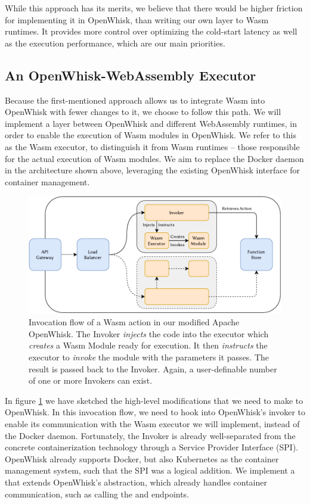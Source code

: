 While this approach has its merits, we believe that there would be higher friction for implementing it in OpenWhisk, than writing our own layer to Wasm runtimes. It provides more control over optimizing the cold-start latency as well as the execution performance, which are our main priorities.

\subsection{An OpenWhisk-WebAssembly Executor}

Because the first-mentioned approach allows us to integrate Wasm into OpenWhisk with fewer changes to it, we choose to follow this path. We will implement a layer between OpenWhisk and different WebAssembly runtimes, in order to enable the execution of Wasm modules in OpenWhisk. We refer to this as the Wasm executor, to distinguish it from Wasm runtimes -- those responsible for the actual execution of Wasm modules. We aim to replace the Docker daemon in the architecture shown above, leveraging the existing OpenWhisk interface for container management.

\begin{figure}
    \includegraphics{figures/WasmOpenWhiskActionInvocationFlow.pdf}
    \caption{Invocation flow of a Wasm action in our modified Apache OpenWhisk. The Invoker \emph{injects} the code into the executor which \emph{creates} a Wasm Module ready for execution. It then \emph{instructs} the executor to \emph{invoke} the module with the parameters it passes. The result is passed back to the Invoker. Again, a user-definable number of one or more Invokers can exist.}
    \label{fig:wasm-openwhisk-action-invocation-flow}
\end{figure}

In figure \ref{fig:wasm-openwhisk-action-invocation-flow} we have sketched the high-level modifications that we need to make to OpenWhisk. In this invocation flow, we need to hook into OpenWhisk's invoker to enable its communication with the Wasm executor we will implement, instead of the Docker daemon. Fortunately, the Invoker is already well-separated from the concrete containerization technology through a Service Provider Interface (SPI). OpenWhisk already supports Docker, but also Kubernetes as the container management system, such that the SPI was a logical addition. We implement a  that extends OpenWhisk's  abstraction, which already handles container communication, such as calling the  and  endpoints.

